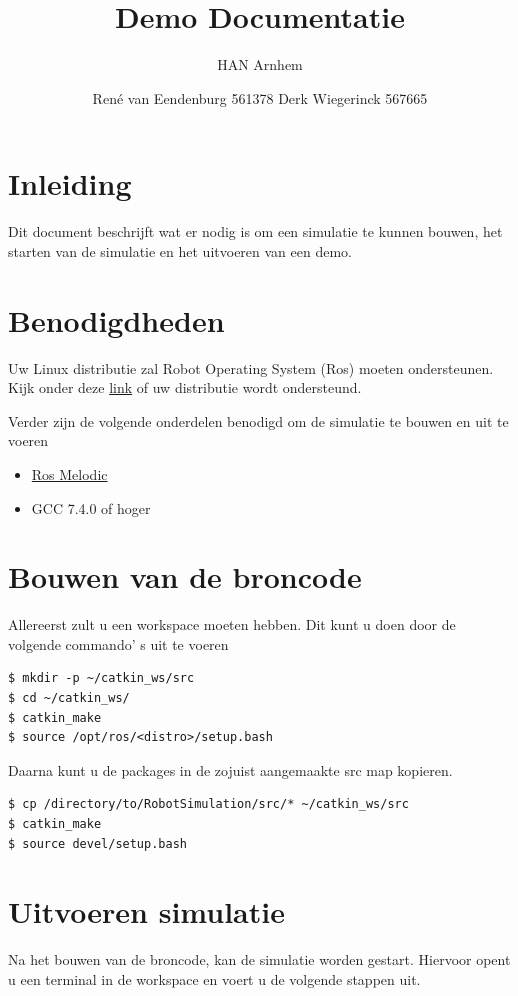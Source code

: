\documentclass[11pt,titlepage]{article}
\author{René van Eendenburg 561378 \cr Derk Wiegerinck 567665}
\title{Demo Documentatie}
\subtitle{HAN Arnhem}{Versie 1}{WOR-World}
\begin{document}
\maketitle



\tableofcontents
\clearpage


\section{Inleiding}
Dit document beschrijft wat er nodig is om een simulatie te kunnen bouwen, het starten van de simulatie en het uitvoeren van een demo.

\section{Benodigdheden}
Uw Linux distributie zal Robot Operating System (Ros) moeten ondersteunen. Kijk onder deze \href{https://www.ros.org/reps/rep-0003.html}{link} of uw distributie wordt ondersteund.

Verder zijn de volgende onderdelen benodigd om de simulatie te bouwen en uit te voeren
\begin{itemize}
    \item \href{http://wiki.ros.org/melodic/Installation}{Ros Melodic}
    \item GCC 7.4.0 of hoger
\end{itemize}

\section{Bouwen van de broncode}
Allereerst zult u een workspace moeten hebben. Dit kunt u doen door de volgende commando' s uit te voeren

\begin{verbatim}
$ mkdir -p ~/catkin_ws/src
$ cd ~/catkin_ws/
$ catkin_make
$ source /opt/ros/<distro>/setup.bash
\end{verbatim}

Daarna kunt u de packages in de zojuist aangemaakte src map kopieren. 

\begin{verbatim}
$ cp /directory/to/RobotSimulation/src/* ~/catkin_ws/src
$ catkin_make
$ source devel/setup.bash
\end{verbatim}

\section{Uitvoeren simulatie}
Na het bouwen van de broncode, kan de simulatie worden gestart. Hiervoor opent u een terminal in de workspace en voert u de volgende stappen uit.
\end{document}
